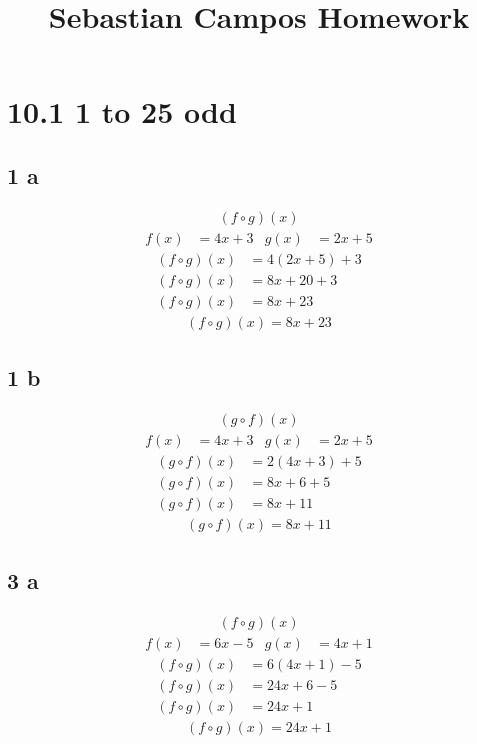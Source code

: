 \documentclass{article}
\title{Sebastian Campos Homework}
\begin{document}
    \maketitle
    \noindent
    \section*{10.1  1 to 25 odd}
    \subsection*{1 a}
    \begin{align*}
        (f \circ g)(x)
    \end{align*}
    \begin{align*}
        f(x) &= 4x + 3 &g(x) &= 2x +5
    \end{align*}
    \begin{align*}
        (f \circ g)(x) &= 4(2x + 5) + 3\\
        (f \circ g)(x) &= 8x + 20 + 3\\
        (f \circ g)(x) &= 8x + 23
    \end{align*}
    \begin{align*}
        \boxed{(f \circ g)(x) = 8x + 23}
    \end{align*}

    \subsection*{1 b}
    \begin{align*}
    (g \circ f)(x)
    \end{align*}
    \begin{align*}
        f(x) &= 4x + 3 &g(x) &= 2x +5
    \end{align*}
    \begin{align*}
        (g \circ f)(x) &= 2(4x + 3) + 5\\
        (g \circ f)(x) &= 8x + 6 + 5\\
        (g \circ f)(x) &= 8x + 11
    \end{align*}
    \begin{align*}
        \boxed{(g \circ f)(x) = 8x + 11}
    \end{align*}

    \subsection*{3 a}
    \begin{align*}
    (f \circ g)(x)
    \end{align*}
    \begin{align*}
        f(x) &= 6x -5  &g(x) &= 4x +1
    \end{align*}
    \begin{align*}
    (f \circ g)(x) &= 6(4x + 1) -5\\
    (f \circ g)(x) &= 24x + 6 - 5\\
    (f \circ g)(x) &= 24x + 1
    \end{align*}
    \begin{align*}
        \boxed{(f \circ g)(x) = 24x + 1}
    \end{align*}
\end{document}
